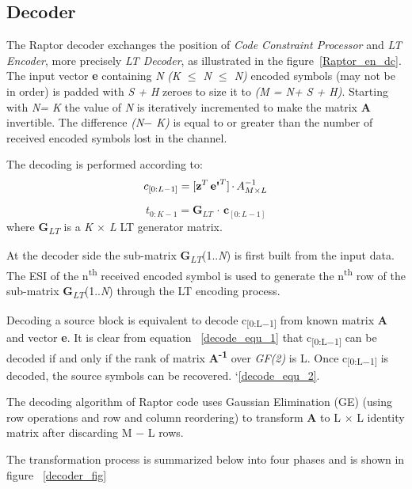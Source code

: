 \subsection{Decoder} \label{decoder} 
The Raptor decoder exchanges the position of \textit{Code Constraint Processor} and \textit{LT Encoder}, more precisely \textit{LT Decoder}, as illustrated in the figure~\ref{Raptor_en_dc}. The input vector \textbf{e}\textquotesingle \: containing \textit{N}\textquotesingle \: \textit{(K $\leq$ N\textquotesingle \: $\leq$ N)} encoded symbols (may not be in order) is padded with \textit{S + H} zeroes to size it to \textit{(M = N\textquotesingle + S + H)}. Starting with \textit{N\textquotesingle \:= K} the value of \textit{N\textquotesingle} is iteratively incremented to make the matrix \textbf{A} invertible. The difference \textit{(N\textquotesingle \:$-$ K)} is equal to or greater than the number of received encoded symbols lost in the channel. 
\par
The decoding is performed according to:
\begin{equation}
\label{decode_equ_1}
c_{[0:L-1]} =  [\textbf{z}^{T} \, \textbf{e\textquotesingle}^{T}] {\,\cdot\,} A_{M \times L}^{-1}
\end{equation}

\begin{equation}
t_{0:K-1} = \textbf{G}_{LT} {\,\cdot\,} \textbf{c}_{[0: L-1]}
\label{decode_equ_2}
\end{equation}
where \textbf{G}\textsubscript{\textit{LT}} is a\textit{ K $\times$ L} LT generator matrix.
\par
At the decoder side the sub-matrix \textbf{G}\textsubscript{\textit{LT}}(1..\textit{N\textquotesingle}) is first built from the input data. The ESI of the n\textsuperscript{th} received encoded symbol is used to generate the n\textsuperscript{th} row of the sub-matrix \textbf{G}\textsubscript{\textit{LT}}(1..\textit{N\textquotesingle}) through the LT encoding process.
\par
Decoding a source block is equivalent to decode c\textsubscript{[0:L$-$1]} from known matrix \textbf{A} and vector \textbf{e\textquotesingle}. It is clear from equation ~\ref{decode_equ_1} that c\textsubscript{[0:L$-$1]} can be decoded if and only if the rank of matrix \textbf{A\textsuperscript{-1}} over \textit{GF(2)} is L. Once c\textsubscript{[0:L$-$1]} is decoded, the source symbols can be recovered. `\ref{decode_equ_2}.
\par
The decoding algorithm of Raptor code uses Gaussian Elimination (GE) (using row operations and row and column reordering) to transform \textbf{A} to L $\times$ L identity matrix after  discarding M $-$ L rows.
\par
The transformation process is summarized below into four phases and is shown in figure ~\ref{decoder_fig}

